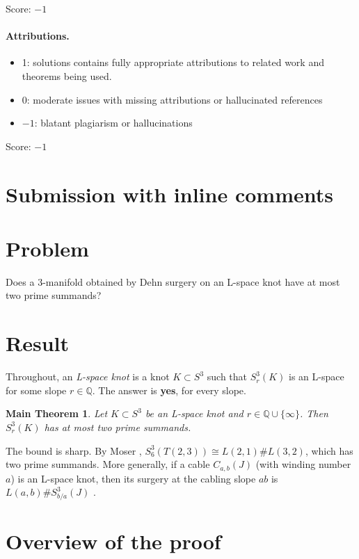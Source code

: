 \documentclass[11pt]{article}
\newtheorem*{maintheorem}{Main Theorem}
\theoremstyle{definition}
\newcommand{\Q}{\mathbb{Q}}
\begin{document}
\noindent Score: $-1$

\paragraph{Attributions.}
\begin{itemize}
	\item  1: solutions contains fully appropriate attributions
		to related work and theorems being used.
	\item  0: moderate issues with missing attributions or hallucinated references
	\item  $-1$: blatant plagiarism or hallucinations
\end{itemize}

\noindent Score: $-1$

\newpage
\section{Submission with inline comments}


\section*{Problem}

Does a $3$-manifold obtained by Dehn surgery on an L-space knot have at most two prime summands?

\section*{Result}

Throughout, an \emph{L-space knot} is a knot $K\subset S^3$ such that $S^3_r(K)$ is an L-space for some slope $r\in\Q$. The answer is \textbf{yes}, for every slope.

\begin{maintheorem}
Let $K\subset S^3$ be an L-space knot and $r\in\Q\cup\{\infty\}$. Then $S^3_r(K)$ has at most two prime summands.
\end{maintheorem}

The bound is sharp. By Moser \cite{Moser}, $S^3_6(T(2,3))\cong L(2,1)\# L(3,2)$, which has two prime summands. More generally, if a cable $C_{a,b}(J)$ (with winding number $a$) is an L-space knot, then its surgery at the cabling slope $ab$ is $L(a,b)\# S^3_{b/a}(J)$ \cite{Gordon83}.

\section*{Overview of the proof}
\end{document}
